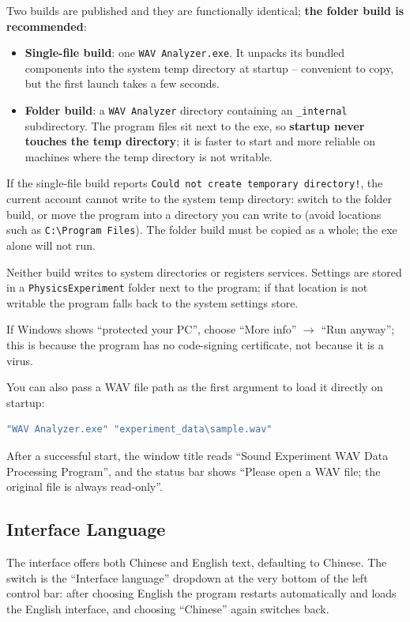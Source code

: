 \documentclass[UTF8,a4paper,12pt]{ctexart}
\begin{document}
Two builds are published and they are functionally identical; \textbf{the folder build is recommended}:

\begin{itemize}
  \item \textbf{Single-file build}: one \texttt{WAV Analyzer.exe}. It unpacks its bundled components into the system temp directory at startup -- convenient to copy, but the first launch takes a few seconds.
  \item \textbf{Folder build}: a \texttt{WAV Analyzer} directory containing an \texttt{\_internal} subdirectory. The program files sit next to the exe, so \textbf{startup never touches the temp directory}; it is faster to start and more reliable on machines where the temp directory is not writable.
\end{itemize}

If the single-file build reports \texttt{Could not create temporary directory!}, the current account cannot write to the system temp directory: switch to the folder build, or move the program into a directory you can write to (avoid locations such as \texttt{C:\textbackslash Program Files}). The folder build must be copied as a whole; the exe alone will not run.

Neither build writes to system directories or registers services. Settings are stored in a \texttt{PhysicsExperiment} folder next to the program; if that location is not writable the program falls back to the system settings store.

If Windows shows ``protected your PC'', choose ``More info'' $\to$ ``Run anyway''; this is because the program has no code-signing certificate, not because it is a virus.

You can also pass a WAV file path as the first argument to load it directly on startup:

\begin{lstlisting}[language=bash]
"WAV Analyzer.exe" "experiment_data\sample.wav"
\end{lstlisting}

After a successful start, the window title reads ``Sound Experiment WAV Data Processing Program'', and the status bar shows ``Please open a WAV file; the original file is always read-only''.

\subsection{Interface Language}

The interface offers both Chinese and English text, defaulting to Chinese. The switch is the ``Interface language'' dropdown at the very bottom of the left control bar: after choosing English the program restarts automatically and loads the English interface, and choosing ``Chinese'' again switches back.
\end{document}
